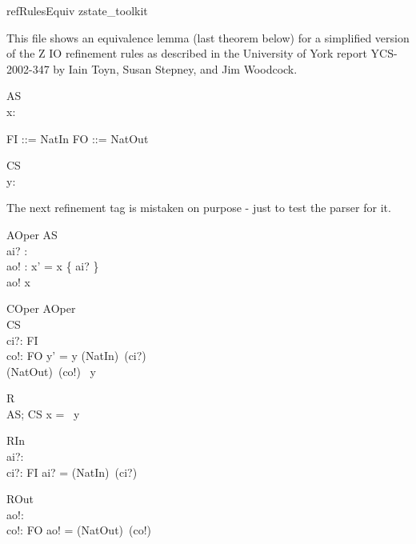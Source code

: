 \begin{zsection}
   \SECTION refRulesEquiv \parents zstate\_toolkit
\end{zsection}

This file shows an equivalence lemma (last theorem below) for a simplified
version of the Z IO refinement rules as described in the University of York
report YCS-2002-347 by Iain Toyn, Susan Stepney, and Jim Woodcock.

\begin{schema}{AS}
\zastate\\
   x: \power~\nat
\end{schema}
\begin{zed}
   FI ::= NatIn \ldata \nat \rdata
 \also
   FO ::= NatOut \ldata \nat \rdata
\end{zed}

\begin{schema}{CS}
\zcstate\\
   y: \seq~\nat
\end{schema}

The next refinement tag is mistaken on purpose - just to test the parser for it.
\begin{schema}{AOper}
   \Delta AS\\
   ai? : \nat\\
   ao! : \nat
\where
   x' = x \cup \{ ai? \}
   \\
   ao! \in x
\end{schema}

\begin{schema}{COper}
\zfsrefines AOper\\
   \Delta CS \\
   ci?: FI \\
   co!: FO
\where
   y' = y \cat \langle (NatIn\inv)~(ci?) \rangle \\
   (NatOut\inv)~(co!) \in \ran~y
\end{schema}

\begin{schema}{R}
\zretrieve\\
   AS; CS
\where
   x = \ran~y
\end{schema}

\begin{schema}{RIn}
\zretrievein\\
   ai?: \nat \\
   ci?: FI
\where
   ai? = (NatIn\inv)~(ci?)
\end{schema}

\begin{schema}{ROut}
\zretrieveout\\
   ao!: \nat \\
   co!: FO
\where
   ao! = (NatOut\inv)~(co!)
\end{schema}

